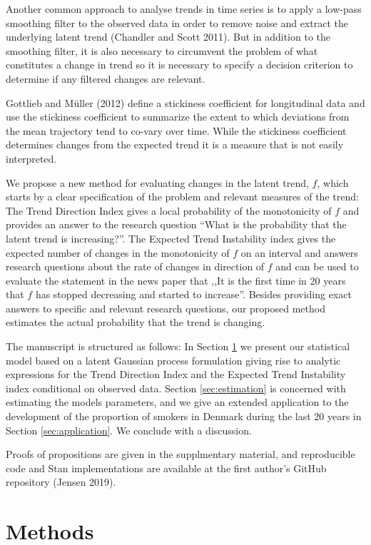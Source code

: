 \documentclass[11pt,]{article}
\theoremstyle{nonumberplain}
\begin{document}
Another common approach to analyse trends in time series is to apply a
low-pass smoothing filter to the observed data in order to remove noise
and extract the underlying latent trend (Chandler and Scott 2011). But
in addition to the smoothing filter, it is also necessary to circumvent
the problem of what constitutes a change in trend so it is necessary to
specify a decision criterion to determine if any filtered changes are
relevant.

Gottlieb and Müller (2012) define a stickiness coefficient for
longitudinal data and use the stickiness coefficient to summarize the
extent to which deviations from the mean trajectory tend to co-vary over
time. While the stickiness coefficient determines changes from the
expected trend it is a measure that is not easily interpreted.

We propose a new method for evaluating changes in the latent trend,
\(f\), which starts by a clear specification of the problem and relevant
measures of the trend: The Trend Direction Index gives a local
probability of the monotonicity of \(f\) and provides an answer to the
research question ``What is the probability that the latent trend is
increasing?''. The Expected Trend Instability index gives the expected
number of changes in the monotonicity of \(f\) on an interval and
answers research questions about the rate of changes in direction of
\(f\) and can be used to evaluate the statement in the news paper that
,,It is the first time in 20 years that \(f\) has stopped decreasing and
started to increase''. Besides providing exact answers to specific and
relevant research questions, our proposed method estimates the actual
probability that the trend is changing.

The manuscript is structured as follows: In Section \ref{sec:method} we
present our statistical model based on a latent Gaussian process
formulation giving rise to analytic expressions for the Trend Direction
Index and the Expected Trend Instability index conditional on observed
data. Section \ref{sec:estimation} is concerned with estimating the
models parameters, and we give an extended application to the
development of the proportion of smokers in Denmark during the last 20
years in Section \ref{sec:application}. We conclude with a discussion.

Proofs of propositions are given in the supplmentary material, and
reproducible code and Stan implementations are available at the first
author's GitHub repository (Jensen 2019).

\section{Methods}\label{sec:method}
\end{document}
